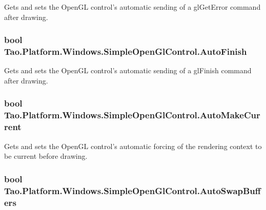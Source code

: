 Gets and sets the OpenGL control's automatic sending of a glGetError command after drawing. 

\hypertarget{class_tao_1_1_platform_1_1_windows_1_1_simple_open_gl_control_a4a9da59cd62cf5979c3fc6a6a34abd4d}{
\subsubsection[{AutoFinish}]{\setlength{\rightskip}{0pt plus 5cm}bool Tao.Platform.Windows.SimpleOpenGlControl.AutoFinish}}
\label{class_tao_1_1_platform_1_1_windows_1_1_simple_open_gl_control_a4a9da59cd62cf5979c3fc6a6a34abd4d}


Gets and sets the OpenGL control's automatic sending of a glFinish command after drawing. 

\hypertarget{class_tao_1_1_platform_1_1_windows_1_1_simple_open_gl_control_a5ed9c1ce7f01443349cf3ca0863ada9f}{
\subsubsection[{AutoMakeCurrent}]{\setlength{\rightskip}{0pt plus 5cm}bool Tao.Platform.Windows.SimpleOpenGlControl.AutoMakeCurrent}}
\label{class_tao_1_1_platform_1_1_windows_1_1_simple_open_gl_control_a5ed9c1ce7f01443349cf3ca0863ada9f}


Gets and sets the OpenGL control's automatic forcing of the rendering context to be current before drawing. 

\hypertarget{class_tao_1_1_platform_1_1_windows_1_1_simple_open_gl_control_a6c9c60d42da646853947e73c6f5449d2}{
\subsubsection[{AutoSwapBuffers}]{\setlength{\rightskip}{0pt plus 5cm}bool Tao.Platform.Windows.SimpleOpenGlControl.AutoSwapBuffers}}
\label{class_tao_1_1_platform_1_1_windows_1_1_simple_open_gl_control_a6c9c60d42da646853947e73c6f5449d2}


